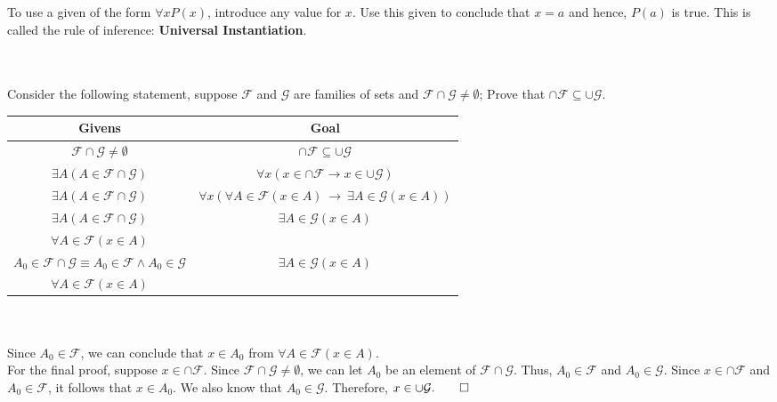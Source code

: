 \documentclass[../setup.tex]{subfiles}
\begin{document}
\begin{theorem}
	To use a given of the form $\forall{x}P(x)$, introduce any value for $x$. Use this given to conclude that $x = a$ and hence, $P(a)$ is true. This is called the rule of inference: \textbf{Universal Instantiation}.
\end{theorem}
\phantom \\ \\
Consider the following statement, suppose $\mathcal{F}$ and $\mathcal{G}$ are families of sets and $\mathcal{F} \cap \mathcal{G} \neq \emptyset$; Prove that $\cap{\mathcal{F}} \subseteq \cup{\mathcal{G}}$.
\begin{center}
	\begin{tabular}[t]{| c | c |}
		\hline
		Givens  & Goal  \\
		\hline
		$\mathcal{F} \cap \mathcal{G} \neq \emptyset$ & $\cap{\mathcal{F}} \subseteq \cup{\mathcal{G}}$ \\
		\hline
		$\exists{A}(A \in \mathcal{F} \cap \mathcal{G})$ & $\forall{x}\left(x \in \cap{\mathcal{F}} \rightarrow x \in \cup{\mathcal{G}}\right)$ \\
		\hline
		$\exists{A}(A \in \mathcal{F} \cap \mathcal{G})$ & $\forall{x}\left(\forall{A}\in\mathcal{F}(x \in A) \ \rightarrow \ \exists{A}\in\mathcal{G}(x \in A)\right)$ \\
		\hline
		$\exists{A}(A \in \mathcal{F} \cap \mathcal{G})$ & $\exists{A}\in\mathcal{G}(x \in A)$ \\
		$\forall{A}\in\mathcal{F}(x \in A)$ & \\
		\hline
		$A_0 \in \mathcal{F} \cap \mathcal{G} \equiv A_0 \in \mathcal{F} \land A_0 \in \mathcal{G}$ & $\exists{A}\in\mathcal{G}(x \in A)$ \\
		$\forall{A}\in\mathcal{F}(x \in A)$ & \\		
		\hline	
	\end{tabular}
\end{center}
\phantom \\ \\
Since $A_0 \in \mathcal{F}$, we can conclude that $x \in A_0$ from $\forall{A}\in\mathcal{F}(x \in A)$. \\
For the final proof, suppose $x \in \cap{\mathcal{F}}$. Since $\mathcal{F} \cap \mathcal{G} \neq \emptyset$, we can let $A_0$ be an element of $\mathcal{F} \cap \mathcal{G}$. Thus, $A_0 \in \mathcal{F}$ and $A_0 \in \mathcal{G}$. Since $x \in \cap{\mathcal{F}}$ and $A_0 \in \mathcal{F}$, it follows that $x \in A_0$. We also know that $A_0 \in \mathcal{G}$. Therefore, $x \in \cup{\mathcal{G}}. \qed$
\end{document}
